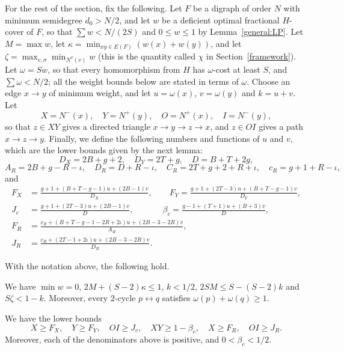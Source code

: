 For the rest of the section, fix the following. Let $F$ be a digraph of order $N$ with minimum
semidegree $d_0>N/2$, and let $w$ be a deficient optimal fractional $H$-cover of $F$, so that
$\sum w<N/(2S)$ and $0\le w\le1$ by Lemma~\ref{general:LP}. Let $M=\max w$, let
$\kappa=\min_{xy\in E(F)}(w(x)+w(y))$, and let $\zeta=\max_{v,\sigma}\min_{N^\sigma(v)}w$ (this is the quantity called $\chi$ in Section~\ref{framework}).
Let $\omega=Sw$, so that every homomorphism from $H$ has $\omega$-cost at least $S$, and $\sum\omega<N/2$; all the weight bounds below are stated in terms
of $\omega$. Choose an edge $x\to y$ of minimum weight, and let $u=\omega(x)$, $v=\omega(y)$ and
$k=u+v$. Let
\[
 X=N^-(x),\quad Y=N^+(y),\quad O=N^+(x),\quad I=N^-(y),
\]
so that $z\in XY$ gives a directed triangle $x\to y\to z\to x$, and $z\in OI$
gives a path $x\to z\to y$. Finally, we define the following numbers and functions of $u$ and $v$, which are the lower bounds given by the next lemma:
\[
 D_X=2B+g+2,\quad D_Y=2T+g,\quad D=B+T+2g,
\]
\[
 A_R=2B+g-R-\iota,\quad D_R=D+R-\iota,\quad
 C_R=2T+g+2+R+\iota,\quad c_R=g+1+R-\iota,
\]
and
\[
\begin{split}
 F_X&=\frac{g+1+(B+T-g-1)u+(2B-1)v}{D_X},\qquad
 F_Y=\frac{g+1+(2T-3)u+(B+T-g-1)v}{D_Y},\\
 J_c&=\frac{g+1+(2T-3)u+(2B-1)v}{D},\qquad\quad\ \
 \beta_c=\frac{g-1+(T+1)u+(B+3)v}{D},\\
 F_R&=\frac{c_R+(B+T-g-1-2R+2\iota)u+(2B-3-2R)v}{A_R},\\
 J_R&=\frac{c_R+(2T-1+2\iota)u+(2B-3-2R)v}{D_R}.
\end{split}
\]
\begin{lemma}
\label{compact390:normalized-cover}\label{compact390:paired-floors}
With the notation above, the following hold.
\begin{props}
\item\label{compact390:normalized-cover:1} We have $\min w=0$, $2M+(S-2)\kappa\le1$, $k<1/2$, $2SM\le S-(S-2)k$ and $S\zeta<1-k$. Moreover, every $2$-cycle $p\leftrightarrow q$ satisfies
$\omega(p)+\omega(q)\ge1$.
\item\label{compact390:normalized-cover:2} We have the lower bounds
\[
 X\ge F_X,\quad Y\ge F_Y,\quad OI\ge J_c,
 \quad XY\ge1-\beta_c,\quad X\ge F_R,\quad OI\ge J_R.
\]
Moreover, each of the denominators above is positive, and $0<\beta_c<1/2$.
\end{props}
\end{lemma}
